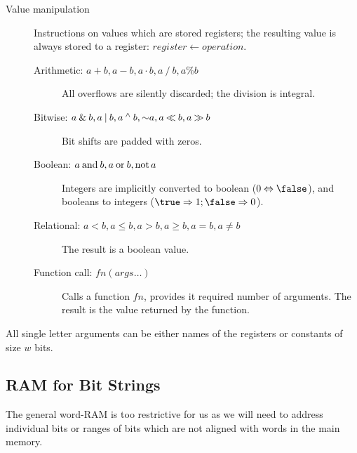 \begin{description}
	\item[Value manipulation]
	Instructions on values which are stored registers; the resulting value is always stored to a register: $\mathit{register} \gets \mathit{operation}$.
	\begin{description}
		\item[Arithmetic: $a + b, a - b, a \cdot b, a \mathbin{/} b, a \% b$]
		All overflows are silently discarded; the division is integral.
		\item[Bitwise: $a \mathbin{\&} b, a \mathbin{|} b, a \mathbin{^\wedge} b, \mathord{\sim} a, a \mathbin{\ll} b, a \mathbin{\gg} b$]
		Bit shifts are padded with zeros.
		\item[Boolean: \textnormal{$a \mathbin{\textrm{and}} b, a \mathbin{\textrm{or}} b, \mathord{\textrm{not}\,} a$}]
		Integers are implicitly converted to boolean ($0 \Leftrightarrow \false$), and booleans to integers ($\true \Rightarrow 1; \false \Rightarrow 0$).
		\item[Relational: $a < b, a \le b, a > b, a \ge b, a = b, a \ne b$]
		The result is a boolean value.
		\item[Function call: $\mathit{fn}(\mathit{args}\ldots)$]
		Calls a function $\mathit{fn}$, provides it required number of arguments.
		The result is the value returned by the function.
	\end{description}
\end{description}
All single letter arguments can be either names of the registers or constants of size $w$ bits.

\subsection{RAM for Bit Strings}

The general word-RAM is too restrictive for us as we will need to address individual bits or ranges of bits which are not aligned with words in the main memory.

